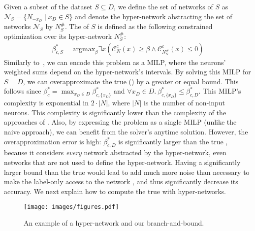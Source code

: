  Given a subset of the dataset $S\subseteq D$, we define the set of networks of $S$ as $\mathcal{N}_S=\{N_{-x_D}\mid x_D \in S \}$ and denote the hyper-network abstracting the set of networks $\mathcal{N}_S$ by $N^\#_S$.
The \propa of $S$ is defined as the following constrained optimization over its hyper-network $N^\#_{S}$:
\begin{align}\label{dphyp}
\beta^*_{c,S}=\text{argmax}_\beta \exists x 
\left( 
\mathcal{C}_{N}^c(x) \geq \beta \land \mathcal{C}_{{N}_{S}^\#}^{c}(x) \leq 0\right )
\end{align}
Similarly to~, we can encode this problem as a MILP, where the neurons' weighted sums depend on the hyper-network's intervals.
By solving this MILP for $S=D$,
we can overapproximate the true \propa () by a greater or equal bound.
This follows since $\beta^*_c= \max_{x_D \in D }\beta^*_{c,\{x_D\}}$ and $\forall x_D \in D.\ \beta_{c,\{x_D\}}^*\leq \beta^*_{c,D}$. 
This MILP's complexity is exponential in $2\cdot |N|$, where $|N|$ is the number of non-input neurons.
This complexity is significantly lower than the complexity of the approaches of . 
Also, by expressing the problem as a single MILP (unlike the naive approach), we can benefit from the solver's anytime solution.
However, the overapproximation error is high: %
$\beta^*_{c,D}$ is significantly larger than the true \propa, because it considers \emph{every} network abstracted by the hyper-network, even networks that are not used to define the hyper-network.
Having a significantly larger bound than the true \propa would lead \tool to add much more noise than necessary to make the label-only access to the network \propi, and thus significantly decrease its accuracy. We next explain how to compute the true \propa with hyper-networks.

 
\begin{figure}[t]
    \centering
  \texttt{[image: images/figures.pdf]}
    \caption{An example of a hyper-network and our branch-and-bound.}
    \label{fig::hyper_bab}
\end{figure}

